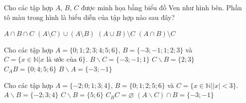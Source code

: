\begin{ex}%
	Cho các tập hợp $A$, $B$, $C$ được minh họa bằng biểu đồ Ven như hình bên. Phần tô màu trong hình là biểu diễn của tập hợp nào sau đây?	\begin{center}
	\def\firstcircle{(0,0) circle (1.5cm)} 
	\def\secondcircle{(45:2cm) circle (1.5cm)} 
	 \def\thirdcircle{(0:2cm) circle (1.5cm)}
\end{center}
\choice 
	{$A\cap B\cap  C$}
	{$\left(A\setminus C\right)\cup \left(A\setminus B\right)$} 
	 {$\left(A\cup B\right)\setminus C$}
	{\True $\left(A\cap B\right)\setminus  C$}
\end{ex}



\begin{ex}%
	Cho các tập hợp $A=\{0;1;2;3;4;5;6\}$, $B=\{-3;-1;1;2;3\}$ và $C=\{x\in  \mathbb{N}|x\text{ là ước của }6\}$.
	\choiceTF 
		{$B\backslash  C=\{-3;-1;1\}$}
		{ $C\backslash  B=\{2;3\}$}
		{\True $C_A  B=\{0;4;5;6\}$}
		{\True $B\backslash A=\{-3;-1\}$} 
\end{ex}

\begin{ex}%
	Cho các tập hợp $A=\{-2;0;1;3;4\}$, $B=\{0;1;2;5;6\}$ và $C=\{x\in  \mathbb{N}||x|<3\}$.
	\choiceTF 
		{\True $A\backslash B=\{-2;3;4\}$} 
		 { $C\backslash B=\{5;6\}$}
		{ $C_B  C=\varnothing$}
		{ $(A\backslash  C)\cap B=\{-3;-1\}$}
\end{ex}

